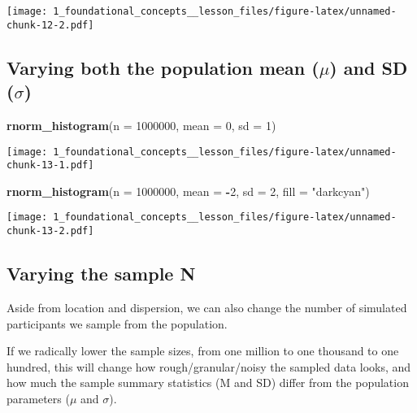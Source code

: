 \documentclass[
]{article}
\newenvironment{Shaded}{\begin{snugshade}}{\end{snugshade}}
\newcommand{\AttributeTok}[1]{\textcolor[rgb]{0.13,0.29,0.53}{#1}}
\newcommand{\DecValTok}[1]{\textcolor[rgb]{0.00,0.00,0.81}{#1}}
\newcommand{\FunctionTok}[1]{\textcolor[rgb]{0.13,0.29,0.53}{\textbf{#1}}}
\newcommand{\NormalTok}[1]{#1}
\newcommand{\SpecialCharTok}[1]{\textcolor[rgb]{0.81,0.36,0.00}{\textbf{#1}}}
\newcommand{\StringTok}[1]{\textcolor[rgb]{0.31,0.60,0.02}{#1}}
\begin{document}
\texttt{[image: 1\_foundational\_concepts\_\_lesson\_files/figure-latex/unnamed-chunk-12-2.pdf]}

\hypertarget{varying-both-the-population-mean-mu-and-sd-sigma}{%
\subsection{\texorpdfstring{Varying both the population mean (\(\mu\))
and SD
(\(\sigma\))}{Varying both the population mean (\textbackslash mu) and SD (\textbackslash sigma)}}\label{varying-both-the-population-mean-mu-and-sd-sigma}}

\begin{Shaded}
\begin{Highlighting}[]
\FunctionTok{rnorm\_histogram}\NormalTok{(}\AttributeTok{n =} \DecValTok{1000000}\NormalTok{, }
                \AttributeTok{mean =} \DecValTok{0}\NormalTok{, }
                \AttributeTok{sd =} \DecValTok{1}\NormalTok{) }
\end{Highlighting}
\end{Shaded}

\texttt{[image: 1\_foundational\_concepts\_\_lesson\_files/figure-latex/unnamed-chunk-13-1.pdf]}

\begin{Shaded}
\begin{Highlighting}[]
\FunctionTok{rnorm\_histogram}\NormalTok{(}\AttributeTok{n =} \DecValTok{1000000}\NormalTok{, }
                \AttributeTok{mean =} \SpecialCharTok{{-}}\DecValTok{2}\NormalTok{, }
                \AttributeTok{sd =} \DecValTok{2}\NormalTok{, }
                \AttributeTok{fill =} \StringTok{"darkcyan"}\NormalTok{) }
\end{Highlighting}
\end{Shaded}

\texttt{[image: 1\_foundational\_concepts\_\_lesson\_files/figure-latex/unnamed-chunk-13-2.pdf]}

\hypertarget{varying-the-sample-n}{%
\subsection{Varying the sample N}\label{varying-the-sample-n}}

Aside from location and dispersion, we can also change the number of
simulated participants we sample from the population.

If we radically lower the sample sizes, from one million to one thousand
to one hundred, this will change how rough/granular/noisy the sampled
data looks, and how much the sample summary statistics (M and SD) differ
from the population parameters (\(\mu\) and \(\sigma\)).
\end{document}
